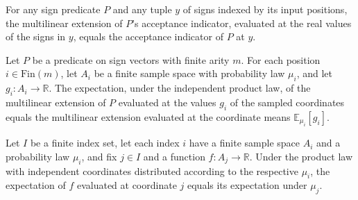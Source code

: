 \begin{theorem}
\label{FABL.RegularUniqueGame.multilinearExtension_signValues}
\leanok
{}
For any sign predicate $P$ and any tuple $y$ of signs indexed by its input positions,
the multilinear extension of $P$'s acceptance indicator, evaluated at the real values of
the signs in $y$, equals the acceptance indicator of $P$ at $y$.
\end{theorem}

\begin{theorem}
\label{FABL.RegularUniqueGame.pmfExpectation_multilinearExtension_productLaw}
\leanok
{}
Let $P$ be a predicate on sign vectors with finite arity $m$. For each position
$i\in\text{Fin}(m)$, let $A_i$ be a finite sample space with probability law $\mu_i$,
and let $g_i:A_i\to\mathbb{R}$. The expectation, under the independent product law, of
the multilinear extension of $P$ evaluated at the values $g_i$ of the sampled
coordinates equals the multilinear extension evaluated at the coordinate means
$\mathbb{E}_{\mu_i}[g_i]$.
\end{theorem}

\begin{theorem}
\label{FABL.RegularUniqueGame.pmfExpectation_independentProductPMF_coordinate}
\leanok
{}
Let $I$ be a finite index set, let each index $i$ have a finite sample space $A_i$ and a
probability law $\mu_i$, and fix $j\in I$ and a function $f:A_j\to\mathbb{R}$. Under the
product law with independent coordinates distributed according to the respective
$\mu_i$, the expectation of $f$ evaluated at coordinate $j$ equals its expectation under
$\mu_j$.
\end{theorem}


